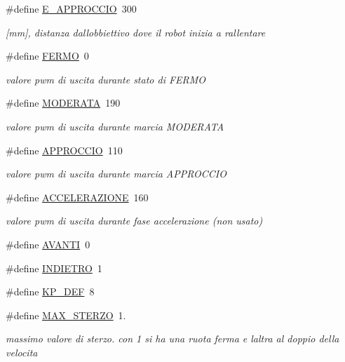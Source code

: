 \begin{DoxyCompactItemize}
\#define \mbox{\hyperlink{ari_pi__2_d_c__esp__08_8ino_a60736df151b230ad9683a2e8dbee13a6}{E\+\_\+\+A\+P\+P\+R\+O\+C\+C\+IO}}~300
\begin{DoxyCompactList}\small\item\em \mbox{[}mm\mbox{]}, distanza dall\textquotesingle{}obbiettivo dove il robot inizia a rallentare \end{DoxyCompactList}\item 
\#define \mbox{\hyperlink{ari_pi__2_d_c__esp__08_8ino_a3ea4f86fda9125c7b34d735b4f14f42a}{F\+E\+R\+MO}}~0
\begin{DoxyCompactList}\small\item\em valore pwm di uscita durante stato di F\+E\+R\+MO \end{DoxyCompactList}\item 
\#define \mbox{\hyperlink{ari_pi__2_d_c__esp__08_8ino_a4774b749cfc65db93b2e726543c9115f}{M\+O\+D\+E\+R\+A\+TA}}~190
\begin{DoxyCompactList}\small\item\em valore pwm di uscita durante marcia M\+O\+D\+E\+R\+A\+TA \end{DoxyCompactList}\item 
\#define \mbox{\hyperlink{ari_pi__2_d_c__esp__08_8ino_a3336677c5466ffd6adee69e68e25f236}{A\+P\+P\+R\+O\+C\+C\+IO}}~110
\begin{DoxyCompactList}\small\item\em valore pwm di uscita durante marcia A\+P\+P\+R\+O\+C\+C\+IO \end{DoxyCompactList}\item 
\#define \mbox{\hyperlink{ari_pi__2_d_c__esp__08_8ino_a9af1e62ce938e1b51a846fc15cf307e3}{A\+C\+C\+E\+L\+E\+R\+A\+Z\+I\+O\+NE}}~160
\begin{DoxyCompactList}\small\item\em valore pwm di uscita durante fase accelerazione (non usato) \end{DoxyCompactList}\item 
\#define \mbox{\hyperlink{ari_pi__2_d_c__esp__08_8ino_a7d6e95bc7ca024893f2bd7d217b2bd6d}{A\+V\+A\+N\+TI}}~0
\item 
\#define \mbox{\hyperlink{ari_pi__2_d_c__esp__08_8ino_a8db0e8841207a8e9ce1845ba10b4a637}{I\+N\+D\+I\+E\+T\+RO}}~1
\item 
\#define \mbox{\hyperlink{ari_pi__2_d_c__esp__08_8ino_a8226ade05454c12b2636c063d60f0050}{K\+P\+\_\+\+D\+EF}}~8
\item 
\#define \mbox{\hyperlink{ari_pi__2_d_c__esp__08_8ino_ae69228439056c7947d8c67f0e31cd555}{M\+A\+X\+\_\+\+S\+T\+E\+R\+ZO}}~1.
\begin{DoxyCompactList}\small\item\em massimo valore di sterzo. con 1 si ha una ruota ferma e l\textquotesingle{}altra al doppio della velocita\textquotesingle{} \end{DoxyCompactList}\end{DoxyCompactItemize}
